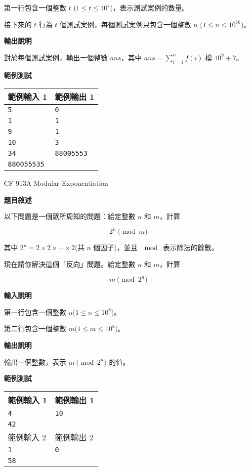     第一行包含一個整數 $t$ ($1 \leq t \leq 10^4$)，表示測試案例的數量。

    接下來的 $t$ 行為 $t$ 個測試案例，每個測試案例只包含一個整數 $n$ ($1 \leq n \leq 10^{16}$)。

    \textbf{輸出說明}

    對於每個測試案例，輸出一個整數 $ans$，其中 $ans=\displaystyle\sum_{i=1}^n f(i)$ 模 $10^9+7$。

    \textbf{範例測試}

    \begin{tabular}{|m{7cm}|m{7cm}|}
        \hline
        範例輸入 1 & 範例輸出 1 \\
        \hline
        \verb|5| & \verb|0| \\
        \verb|1| & \verb|1| \\
        \verb|9| & \verb|1| \\
        \verb|10| & \verb|3| \\
        \verb|34| & \verb|88005553| \\
        \verb|880055535| & \\
        \hline
    \end{tabular}

    \problem CF 913A Modular Exponentiation

    \textbf{題目敘述}

    以下問題是一個眾所周知的問題：給定整數 $n$ 和 $m$，計算

    $$2^n \pmod m$$

    其中 $2^n = 2 \times 2 \times \cdots \times 2$(共 $n$ 個因子)，並且 $\mod$ 表示除法的餘數。

    現在請你解決這個「反向」問題。給定整數 $n$ 和 $m$，計算

    $$m \pmod {2^n}$$

    \textbf{輸入說明}

    第一行包含一個整數 $n$($1 \leq n \leq 10^8$)。

    第二行包含一個整數 $m$($1 \leq m \leq 10^8$)。

    \textbf{輸出說明}

    輸出一個整數，表示 $m \pmod {2^n}$ 的值。

    \textbf{範例測試}

    \begin{tabular}{|m{7cm}|m{7cm}|}
        \hline
        範例輸入 1 & 範例輸出 1 \\
        \hline
        \verb|4| & \verb|10| \\
        \verb|42| & \\
        \hline
        範例輸入 2 & 範例輸出 2 \\
        \hline
        \verb|1| & \verb|0| \\
        \verb|58| & \\
        \hline
    \end{tabular}

